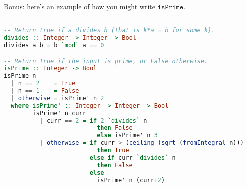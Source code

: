 \documentclass[a4paper,12pt]{article}
\newcommand{\kwa}[1]{\mathtt{#1}}
\begin{document}
\noindent
Bonus: here's an example of how you might write $\kwa{isPrime}$.

\begin{lstlisting}[language=Haskell]

-- Return true if a divides b (that is k*a = b for some k).
divides :: Integer -> Integer -> Bool
divides a b = b `mod` a == 0

-- Return True if the input is prime, or False otherwise.
isPrime :: Integer -> Bool
isPrime n
  | n == 2    = True
  | n == 1    = False
  | otherwise = isPrime' n 2
  where isPrime' :: Integer -> Integer -> Bool
        isPrime' n curr
          | curr == 2 = if 2 `divides` n
                          then False
                          else isPrime' n 3
          | otherwise = if curr > (ceiling (sqrt (fromIntegral n)))
                          then True
                        else if curr `divides` n
                          then False
                        else
                          isPrime' n (curr+2)
\end{lstlisting}
\end{document}
